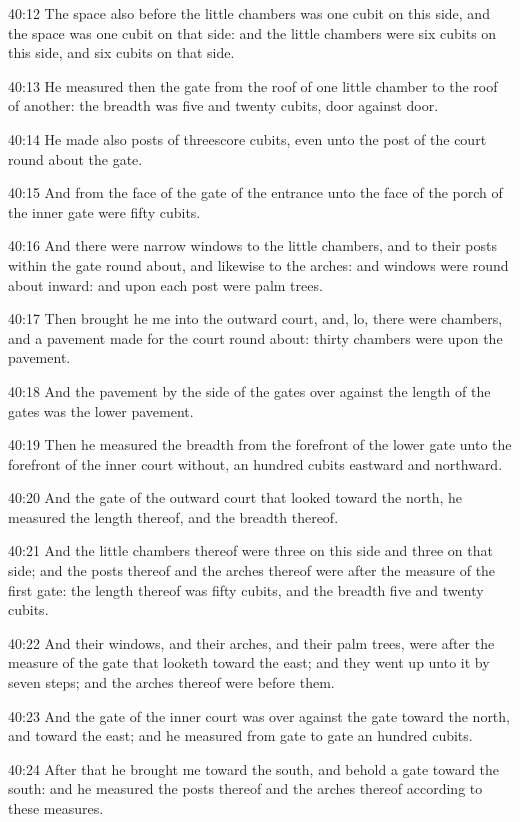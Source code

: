 40:12 The space also before the little chambers was one cubit on this
side, and the space was one cubit on that side: and the little
chambers were six cubits on this side, and six cubits on that side.

40:13 He measured then the gate from the roof of one little chamber to
the roof of another: the breadth was five and twenty cubits, door
against door.

40:14 He made also posts of threescore cubits, even unto the post of
the court round about the gate.

40:15 And from the face of the gate of the entrance unto the face of
the porch of the inner gate were fifty cubits.

40:16 And there were narrow windows to the little chambers, and to
their posts within the gate round about, and likewise to the arches:
and windows were round about inward: and upon each post were palm
trees.

40:17 Then brought he me into the outward court, and, lo, there were
chambers, and a pavement made for the court round about: thirty
chambers were upon the pavement.

40:18 And the pavement by the side of the gates over against the
length of the gates was the lower pavement.

40:19 Then he measured the breadth from the forefront of the lower
gate unto the forefront of the inner court without, an hundred cubits
eastward and northward.

40:20 And the gate of the outward court that looked toward the north,
he measured the length thereof, and the breadth thereof.

40:21 And the little chambers thereof were three on this side and
three on that side; and the posts thereof and the arches thereof were
after the measure of the first gate: the length thereof was fifty
cubits, and the breadth five and twenty cubits.

40:22 And their windows, and their arches, and their palm trees, were
after the measure of the gate that looketh toward the east; and they
went up unto it by seven steps; and the arches thereof were before
them.

40:23 And the gate of the inner court was over against the gate toward
the north, and toward the east; and he measured from gate to gate an
hundred cubits.

40:24 After that he brought me toward the south, and behold a gate
toward the south: and he measured the posts thereof and the arches
thereof according to these measures.

